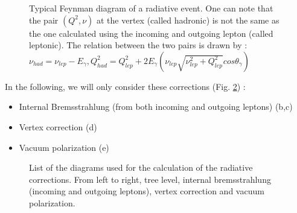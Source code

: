 \begin{figure}[htb]
\centering
{}
\caption{Typical Feynman diagram of a radiative event. One can note that the pair $(Q^2,\nu)$ at the vertex (called hadronic) is not the same as the one calculated using the incoming and outgoing lepton (called leptonic). The relation between the two pairs is drawn by : $\nu_{had} = \nu_{lep} - E_\gamma, Q^2_{had}=Q^2_{lep}+2E_\gamma(\nu_{lep} \sqrt{\nu_{lep}^2+Q^2_{lep}}cos\theta_\gamma)$}
\label{fig:rad_evt}
\end{figure}


In the following, we will only consider these corrections (Fig. \ref{fig:rad_dia}) :
\begin{itemize}
\item Internal Bremsstrahlung (from both incoming and outgoing leptons) (b,c)
\item Vertex correction (d)
\item Vacuum polarization (e)
\end{itemize}

\begin{figure}[htb]
\centerline{}
\caption{List of the diagrams used for the calculation of the radiative corrections. From left to right, tree level, internal bremsstrahlung (incoming and outgoing leptons), vertex correction and vacuum polarization.}\label{fig:rad_dia}
\end{figure}

